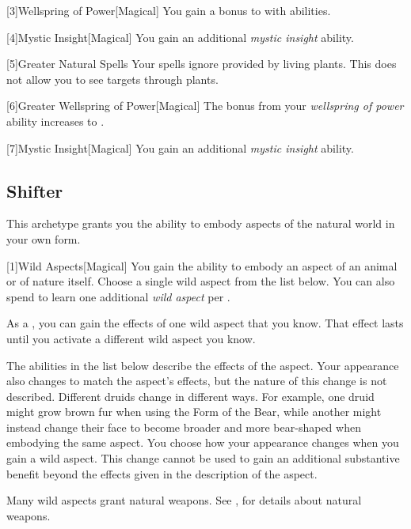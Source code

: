         [3]{Wellspring of Power}[Magical]
        You gain a  bonus to  with  abilities.

        [4]{Mystic Insight}[Magical]
        You gain an additional \textit{mystic insight} ability.

        [5]{Greater Natural Spells} Your spells ignore  provided by living plants.
        This does not allow you to see targets through plants.

        [6]{Greater Wellspring of Power}[Magical]
        The bonus from your \textit{wellspring of power} ability increases to .

        [7]{Mystic Insight}[Magical]
        You gain an additional \textit{mystic insight} ability.

    \subsection{Shifter}\label{Shifter}
        This archetype grants you the ability to embody aspects of the natural world in your own form.

        [1]{Wild Aspects}[Magical]
        You gain the ability to embody an aspect of an animal or of nature itself.
        Choose a single wild aspect from the list below.
        You can also spend  to learn one additional \textit{wild aspect} per .

        As a , you can gain the effects of one wild aspect that you know.
        That effect lasts until you activate a different wild aspect you know.

        The abilities in the list below describe the effects of the aspect.
        Your appearance also changes to match the aspect's effects, but the nature of this change is not described.
        Different druids change in different ways.
        For example, one druid might grow brown fur when using the Form of the Bear, while another might instead change their face to become broader and more bear-shaped when embodying the same aspect.
        You choose how your appearance changes when you gain a wild aspect.
        This change cannot be used to gain an additional substantive benefit beyond the effects given in the description of the aspect.

        Many wild aspects grant natural weapons.
        See , for details about natural weapons.

